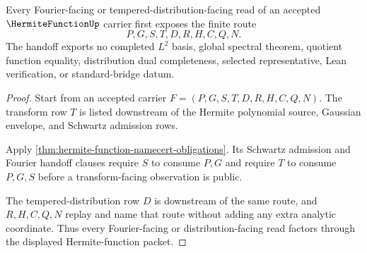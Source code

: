 \begin{theorem}
\label{thm:hermite-function-fourier-transform-handoff}
Every Fourier-facing or tempered-distribution-facing read of an accepted $\HermiteFunctionUp$ carrier first exposes the finite route
$$
P,G,S,T,D,R,H,C,Q,N .
$$
The handoff exports no completed $L^2$ basis, global spectral theorem, quotient function equality, distribution dual completeness, selected representative, Lean verification, or standard-bridge datum.
\end{theorem}
\begin{proof}
Start from an accepted carrier $F=(P,G,S,T,D,R,H,C,Q,N)$. The transform row $T$ is listed downstream of the Hermite polynomial source, Gaussian envelope, and Schwartz admission rows.

Apply \autoref{thm:hermite-function-namecert-obligations}. Its Schwartz admission and Fourier handoff clauses require $S$ to consume $P,G$ and require $T$ to consume $P,G,S$ before a transform-facing observation is public.

The tempered-distribution row $D$ is downstream of the same route, and $R,H,C,Q,N$ replay and name that route without adding any extra analytic coordinate. Thus every Fourier-facing or distribution-facing read factors through the displayed Hermite-function packet.
\end{proof}




